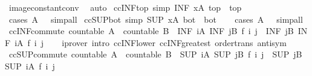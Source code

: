 \begin{isabellebody}
%
\isatagproof
{}\isamarkupfalse%
\ image{\isacharunderscore}constant{\isacharunderscore}conv\ \isamarkupfalse%
\ auto%
\endisatagproof
{\isafoldproof}%
%
\isadelimproof
\isanewline
%
\endisadelimproof
\isanewline
{}\isamarkupfalse%
\ ccINF{\isacharunderscore}top\ {\isacharbrackleft}simp{\isacharbrackright}{\isacharcolon}\ {\isachardoublequoteopen}{\isacharparenleft}INF\ x{\isasymin}A{\isachardot}\ top{\isacharparenright}\ {\isacharequal}\ top{\isachardoublequoteclose}\isanewline
%
\isadelimproof
\ \ %
\endisadelimproof
%
\isatagproof
{}\isamarkupfalse%
\ {\isacharparenleft}cases\ {\isachardoublequoteopen}A\ {\isacharequal}\ {\isacharbraceleft}{\isacharbraceright}{\isachardoublequoteclose}{\isacharparenright}\ simp{\isacharunderscore}all%
\endisatagproof
{\isafoldproof}%
%
\isadelimproof
\isanewline
%
\endisadelimproof
\isanewline
{}\isamarkupfalse%
\ ccSUP{\isacharunderscore}bot\ {\isacharbrackleft}simp{\isacharbrackright}{\isacharcolon}\ {\isachardoublequoteopen}{\isacharparenleft}SUP\ x{\isasymin}A{\isachardot}\ bot{\isacharparenright}\ {\isacharequal}\ bot{\isachardoublequoteclose}\isanewline
%
\isadelimproof
\ \ %
\endisadelimproof
%
\isatagproof
{}\isamarkupfalse%
\ {\isacharparenleft}cases\ {\isachardoublequoteopen}A\ {\isacharequal}\ {\isacharbraceleft}{\isacharbraceright}{\isachardoublequoteclose}{\isacharparenright}\ simp{\isacharunderscore}all%
\endisatagproof
{\isafoldproof}%
%
\isadelimproof
\isanewline
%
\endisadelimproof
\isanewline
{}\isamarkupfalse%
\ ccINF{\isacharunderscore}commute{\isacharcolon}\ {\isachardoublequoteopen}countable\ A\ {\isasymLongrightarrow}\ countable\ B\ {\isasymLongrightarrow}\ {\isacharparenleft}INF\ i{\isasymin}A{\isachardot}\ INF\ j{\isasymin}B{\isachardot}\ f\ i\ j{\isacharparenright}\ {\isacharequal}\ {\isacharparenleft}INF\ j{\isasymin}B{\isachardot}\ INF\ i{\isasymin}A{\isachardot}\ f\ i\ j{\isacharparenright}{\isachardoublequoteclose}\isanewline
%
\isadelimproof
\ \ %
\endisadelimproof
%
\isatagproof
{}\isamarkupfalse%
\ {\isacharparenleft}iprover\ intro{\isacharcolon}\ ccINF{\isacharunderscore}lower\ ccINF{\isacharunderscore}greatest\ order{\isacharunderscore}trans\ antisym{\isacharparenright}%
\endisatagproof
{\isafoldproof}%
%
\isadelimproof
\isanewline
%
\endisadelimproof
\isanewline
{}\isamarkupfalse%
\ ccSUP{\isacharunderscore}commute{\isacharcolon}\ {\isachardoublequoteopen}countable\ A\ {\isasymLongrightarrow}\ countable\ B\ {\isasymLongrightarrow}\ {\isacharparenleft}SUP\ i{\isasymin}A{\isachardot}\ SUP\ j{\isasymin}B{\isachardot}\ f\ i\ j{\isacharparenright}\ {\isacharequal}\ {\isacharparenleft}SUP\ j{\isasymin}B{\isachardot}\ SUP\ i{\isasymin}A{\isachardot}\ f\ i\ j{\isacharparenright}{\isachardoublequoteclose}\isanewline

\end{isabellebody}
